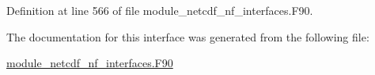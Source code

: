Definition at line 566 of file module\+\_\+netcdf\+\_\+nf\+\_\+interfaces.\+F90.



The documentation for this interface was generated from the following file\+:\begin{DoxyCompactItemize}
\item 
\hyperlink{module__netcdf__nf__interfaces_8F90}{module\+\_\+netcdf\+\_\+nf\+\_\+interfaces.\+F90}\end{DoxyCompactItemize}
